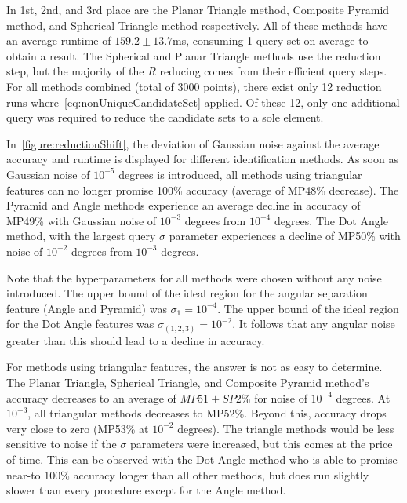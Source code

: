 In 1st, 2nd, and 3rd place are the Planar Triangle method, Composite Pyramid method, and Spherical Triangle method
respectively.
All of these methods have an average runtime of $159.2 \pm 13.7$ms, consuming 1 query set on average to obtain a result.
The Spherical and Planar Triangle methods use the  reduction step, but the majority of the $R$ reducing
comes from their efficient query steps.
For all methods combined (total of 3000 points), there exist only 12 reduction runs
where~\autoref{eq:nonUniqueCandidateSet} applied.
Of these 12, only one additional query was required to reduce the candidate sets to a sole element.

In~\autoref{figure:reductionShift}, the deviation of Gaussian noise against the average accuracy and runtime is
displayed for different identification methods.
As soon as Gaussian noise of $10^{-5}$ degrees is introduced, all methods using triangular features can no longer
promise 100\% accuracy (average of MP48\% decrease).
The Pyramid and Angle methods experience an average decline in accuracy of MP49\% with Gaussian noise of $10^{-3}$
degrees from $10^{-4}$ degrees.
The Dot Angle method, with the largest query $\sigma$ parameter experiences a decline of MP50\% with noise of $10^{-2}$
degrees from $10^{-3}$ degrees.

Note that the hyperparameters for all methods were chosen without any noise introduced.
The upper bound of the ideal region for the angular separation feature (Angle and Pyramid) was $\sigma_1 = 10^{-4}$.
The upper bound of the ideal region for the Dot Angle features was $\sigma_{(1, 2, 3)} = 10^{-2}$.
It follows that any angular noise greater than this should lead to a decline in accuracy.

For methods using triangular features, the answer is not as easy to determine.
The Planar Triangle, Spherical Triangle, and Composite Pyramid method's accuracy decreases to an average of
$MP51 \pm SP2\%$ for noise of $10^{-4}$ degrees.
At $10^{-3}$, all triangular methods decreases to MP52\%.
Beyond this, accuracy drops very close to zero (MP53\% at $10^{-2}$ degrees).
The triangle methods would be less sensitive to noise if the $\sigma$ parameters were increased, but this comes at the
price of time.
This can be observed with the Dot Angle method who is able to promise near-to 100\% accuracy longer than all other
methods, but does run slightly slower than every procedure except for the Angle method.

